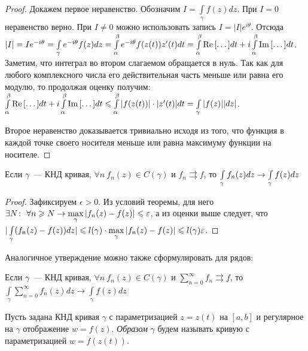 \begin{proof}
    Докажем первое неравенство. Обозначим \(I = \int\limits_{\gamma} f(z) dz\). При \(I = 0\)
    неравенство верно. При \(I \ne 0\) можно использовать запись \(I = |I|e^{i\theta}\). Отсюда
    \(|I| = Ie^{-i\theta} = \int\limits_{\gamma} e^{-i\theta} f(z) dz =
    \int\limits_{\alpha}^{\beta} e^{-i\theta} f(z(t)) z'(t) dt = \int\limits_{\alpha}^{\beta}
    \operatorname{Re}{[\dots]} dt + i \int\limits_{\alpha}^{\beta} \operatorname{Im}{[\dots]} dt\). Заметим, что интеграл во
    втором слагаемом обращается в нуль. Так как для любого комплексного числа его действительная
    часть меньше или равна его модулю, то продолжая оценку получим: \(\int\limits_{\alpha}^{\beta}
    \re{[\dots]} dt + i \int\limits_{\alpha}^{\beta} \im{[\dots]} dt \hm\le
    \int\limits_{\alpha}^{\beta} |f(z(t))| \cdot |z'(t)| dt = \int\limits_{\gamma} |f(z)| |dz|\).

    Второе неравенство доказывается тривиально исходя из того, что функция в каждой точке своего
    носителя меньше или равна максимуму функции на носителе.
\end{proof}

\begin{statement}
    Если \(\gamma\)~--- КНД кривая, \(\forall n \ f_n(z) \in C(\gamma)\) и \(f_n \rightrightarrows
    f\), то \(\int\limits_{\gamma} f_n(z) dz \hm\rightarrow \int\limits_{\gamma} f(z) dz\)
\end{statement}

\begin{proof}
    Зафиксируем \(\epsilon > 0\). Из условий теоремы, для него \(\exists N \colon \ \forall n \ge N
    \hm\rightarrow \max\limits_{\gamma}{|f_n(z) - f(z)| \le \epsilon}\), а из оценки выше следует,
    что \(|\int\limits_{\gamma} (f_n(z) - f(z)) dz| \le l(\gamma) \hm \cdot
    \max\limits_{\gamma}{|f_n(z) - f(z)|} \le l(\gamma)\epsilon\).
\end{proof}

Аналогичное утверждение можно также сформулировать для рядов:

\begin{statement}
    Если \(\gamma\)~--- КНД кривая, \(\forall n \ f_n(z) \in C(\gamma)\) и
    \(\sum\limits_{n=0}^{\infty}f_n \rightrightarrows f\), то \(\int\limits_{\gamma}
    \sum\limits_{n=0}^{\infty} f_n(z) dz \rightarrow \int\limits_{\gamma} f(z) dz\)
\end{statement}

\begin{definition}
    Пусть задана КНД кривая \(\gamma\) с параметризацией \(z = z(t)\) на \([a, b]\) и регулярное на
    \(\gamma\) отображение \(w = f(z)\). \textit{Образом} \(\gamma\) будем называть кривую с
    параметризацией \(w = f(z(t))\).
\end{definition}

